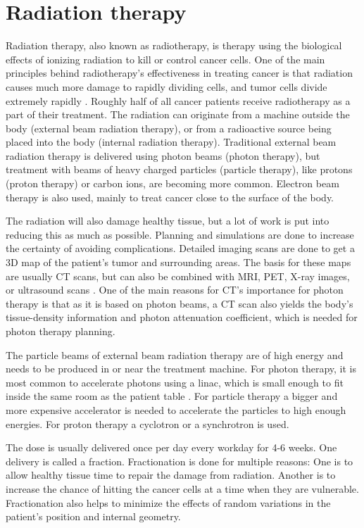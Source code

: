 \documentclass[../main/thesis.tex]{subfiles}
\begin{document}
\section{Radiation therapy}
\label{t-therapy}
Radiation therapy, also known as radiotherapy, is therapy using the biological effects of ionizing radiation to kill or control cancer cells. One of the main principles behind radiotherapy's effectiveness in treating cancer is that radiation causes much more damage to rapidly dividing cells, and tumor cells divide extremely rapidly \citep[chap. 45]{Serway}. Roughly half of all cancer patients receive radiotherapy as a part of their treatment. The radiation can originate from a machine outside the body (external beam radiation therapy), or from a radioactive source being placed into the body (internal radiation therapy). Traditional external beam radiation therapy is delivered using photon beams (photon therapy), but treatment with beams of heavy charged particles (particle therapy), like protons (proton therapy) or carbon ions, are becoming more common. Electron beam therapy is also used, mainly to treat cancer close to the surface of the body. \citep{nih}

The radiation will also damage healthy tissue, but a lot of work is put into reducing this as much as possible. Planning and simulations are done to increase the certainty of avoiding complications. Detailed imaging scans are done to get a 3D map of the patient's tumor and surrounding areas. The basis for these maps are usually \gls{CT} scans, but can also be combined with \gls{MRI}, \gls{PET}, X-ray images, or ultrasound scans \citep{nih}. One of the main reasons for \gls{CT}'s importance for photon therapy is that as it is based on photon beams, a \gls{CT} scan also yields the body's tissue-density information and photon attenuation coefficient, which is needed for photon therapy planning.  \citep[chap. 12]{Khan}

The particle beams of external beam radiation therapy are of high energy and needs to be produced in or near the treatment machine. For photon therapy, it is most common to accelerate photons using a \gls{linac}, which is small enough to fit inside the same room as the patient table \citep{nih}. For particle therapy a bigger and more expensive accelerator is needed to accelerate the particles to high enough energies. For proton therapy a cyclotron or a synchrotron is used. \citep[chap. 27]{Khan}

The dose is usually delivered once per day every workday for 4-6 weeks. One delivery is called a fraction. Fractionation is done for multiple reasons: One is to allow healthy tissue time to repair the damage from radiation. Another is to increase the chance of hitting the cancer cells at a time when they are vulnerable. Fractionation also helps to minimize the effects of random variations in the patient's position and internal geometry. \citep{fractionation} \citep{hysing-uncertain}
\end{document}

